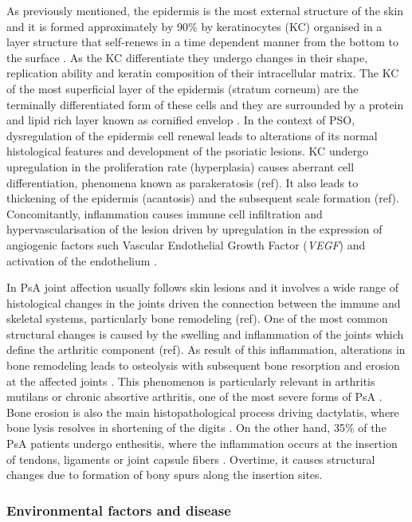 As previously mentioned, the epidermis is the most external structure of the skin and it is formed approximately by 90\% by keratinocytes (KC) organised in a layer structure that self-renews in a time dependent manner from the bottom to the surface \parencite{Wikramanayake2014}. As the KC differentiate they undergo changes in their shape, replication ability and keratin composition of their intracellular matrix. The KC of the most superficial layer of the epidermis (stratum corneum) are the terminally differentiated form of these cells and they are surrounded by a protein and lipid rich layer known as cornified envelop . In the context of PSO, dysregulation of the epidermis cell renewal leads to alterations of its normal histological features and development of the psoriatic lesions. KC undergo upregulation in the proliferation rate (hyperplasia) causes aberrant cell differentiation, phenomena known as parakeratosis (ref). It also leads to thickening of the epidermis (acantosis) and the subsequent scale formation (ref). Concomitantly, inflammation causes immune cell infiltration and hypervascularisation of the lesion driven by upregulation in the expression of angiogenic factors such Vascular Endothelial Growth Factor (\textit{VEGF}) and activation of the endothelium \parencite{Perera2012}. 

In PsA joint affection usually follows skin lesions and it involves a wide range of histological changes in the joints driven the connection between the immune and skeletal systems, particularly bone remodeling (ref). One of the most common structural changes is caused by the swelling and inflammation of the joints which define the arthritic component (ref). As result of this inflammation, alterations in bone remodeling leads to osteolysis with subsequent bone resorption and erosion at the affected joints \parencite{Mensah2017}. This phenomenon is particularly relevant in arthritis mutilans or chronic absortive arthritis, one of the most severe forms of PsA \parencite{Haddad2013}. Bone erosion is also the main histopathological process driving dactylatis, where bone lysis resolves in shortening of the digits \parencite{Gladman2005}. On the other hand, 35\% of the PsA patients undergo enthesitis, where the inflammation occurs at the insertion of tendons, ligaments or joint capsule fibers \parencite{Polachek2017}. Overtime, it causes structural changes due to formation of bony spurs along the insertion sites\parencite{Schett2011}.


\subsubsection{Environmental factors and disease}

